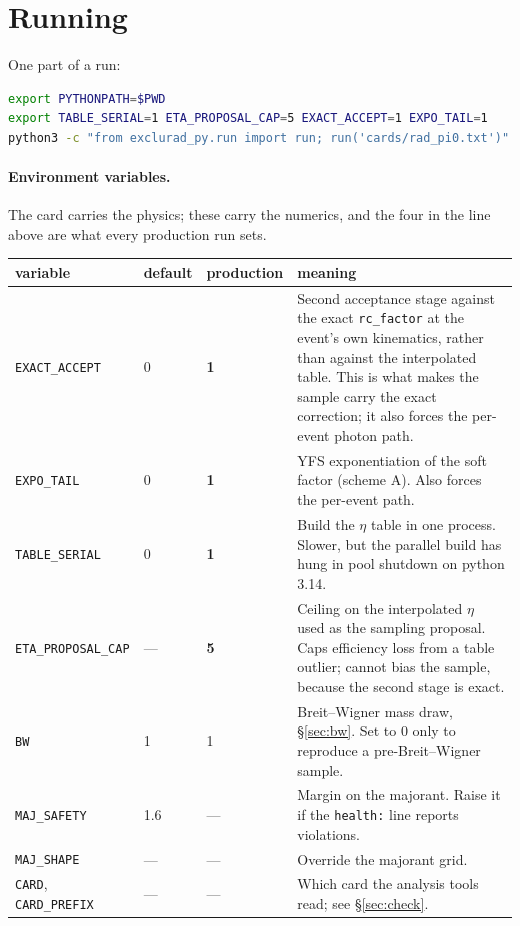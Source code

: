 \documentclass[11pt]{article}
\newcommand{\code}[1]{\texttt{#1}}
\begin{document}
\section{Running}

One part of a run:

\begin{lstlisting}[language=bash]
export PYTHONPATH=$PWD
export TABLE_SERIAL=1 ETA_PROPOSAL_CAP=5 EXACT_ACCEPT=1 EXPO_TAIL=1
python3 -c "from exclurad_py.run import run; run('cards/rad_pi0.txt')"
\end{lstlisting}

\paragraph{Environment variables.} The card carries the physics; these carry
the numerics, and the four in the line above are what every production run
sets.

\begin{center}
\small
\begin{tabular}{lll p{7.0cm}}
\toprule
variable & default & production & meaning \\
\midrule
\code{EXACT\_ACCEPT}     & 0 & \textbf{1} & Second acceptance stage against
  the exact \code{rc\_factor} at the event's own kinematics, rather than
  against the interpolated table. This is what makes the sample carry the
  exact correction; it also forces the per-event photon path. \\
\code{EXPO\_TAIL}        & 0 & \textbf{1} & YFS exponentiation of the soft
  factor (scheme A). Also forces the per-event path. \\
\code{TABLE\_SERIAL}     & 0 & \textbf{1} & Build the $\eta$ table in one
  process. Slower, but the parallel build has hung in pool shutdown on
  python 3.14. \\
\code{ETA\_PROPOSAL\_CAP}& --- & \textbf{5} & Ceiling on the interpolated
  $\eta$ used as the sampling proposal. Caps efficiency loss from a table
  outlier; cannot bias the sample, because the second stage is exact. \\
\code{BW}                & 1 & 1 & Breit--Wigner mass draw, §\ref{sec:bw}.
  Set to 0 only to reproduce a pre-Breit--Wigner sample. \\
\code{MAJ\_SAFETY}       & 1.6 & --- & Margin on the majorant. Raise it if the
  \code{health:} line reports violations. \\
\code{MAJ\_SHAPE}        & --- & --- & Override the majorant grid. \\
\code{CARD}, \code{CARD\_PREFIX} & --- & --- & Which card the analysis tools
  read; see §\ref{sec:check}. \\
\bottomrule
\end{tabular}
\end{center}
\end{document}
